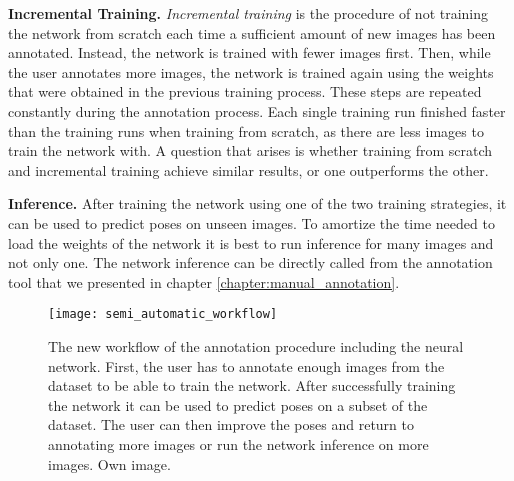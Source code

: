 \noindent\textbf{Incremental Training.} \textit{Incremental training} is the procedure of not training the network from scratch each time a sufficient amount of new images has been annotated. Instead, the network is trained with fewer images first. Then, while the user annotates more images, the network is trained again using the weights that were obtained in the previous training process. These steps are repeated constantly during the annotation process. Each single training run finished faster than the training runs when training from scratch, as there are less images to train the network with. A question that arises is whether training from scratch and incremental training achieve similar results, or one outperforms the other.

\noindent\textbf{Inference.}  After training the network using one of the two training strategies, it can be used to predict poses on unseen images. To amortize the time needed to load the weights of the network it is best to run inference for many images and not only one. The network inference can be directly called from the annotation tool that we presented in chapter \ref{chapter:manual_annotation}.

\begin{figure}[!tbp]
	\centering
    \texttt{[image: semi\_automatic\_workflow]}
    \caption{The new workflow of the annotation procedure including the neural network. First, the user has to annotate enough images from the dataset to be able to train the network. After successfully training the network it can be used to predict poses on a subset of the dataset. The user can then improve the poses and return to annotating more images or run the network inference on more images. Own image.}
    	\label{fig:semi_automatic_workflow}
\end{figure}